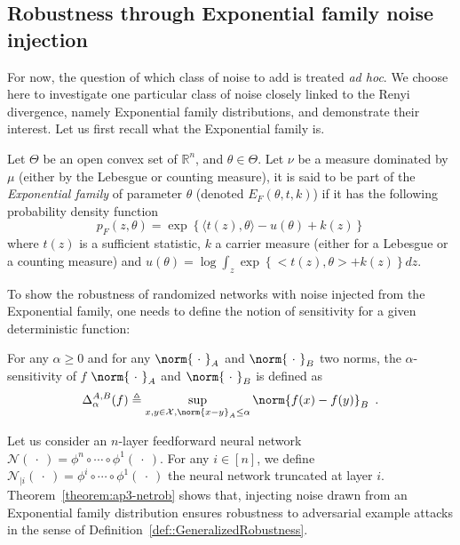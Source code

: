 \subsection{Robustness through Exponential family noise injection}

For now, the question of which class of noise to add is treated \textit{ad hoc}.
We choose here to investigate one particular class of noise closely linked to the Renyi divergence, namely Exponential family distributions, and demonstrate their interest.
Let us first recall what the Exponential family is.

\begin{definition}
  Let $\Theta$ be an open convex set of $\mathbb{R}^{n}$, and $\theta \in \Theta$.
  Let $\nu$ be a measure dominated by $\mu$ (either by the Lebesgue or counting measure), it is said to be part of the \emph{Exponential family} of parameter $\theta$ (denoted $E_{F}(\theta,t,k)$) if it has the following probability density function 
  \begin{equation}
    p_{F}(z,\theta)=\exp\left\{ \langle t(z),\theta \rangle -u(\theta) +k(z) \right\}
  \end{equation}
  where $t(z)$ is a sufficient statistic, $k$ a carrier measure (either for a Lebesgue or a counting measure) and $u(\theta) = \log \int_{z} \exp\left\{ <t(z),\theta> +k(z) \right\} dz $.
\end{definition}

\noindent
To show the robustness of randomized networks with noise injected from the Exponential family, one needs to define the notion of sensitivity for a given deterministic function:
\begin{definition}
  For any $\alpha\geq0$ and for any $\norm{\ \cdot\ }_A$ and $\norm{\ \cdot\ }_B$ two norms, the $\alpha$-sensitivity of $f$ \wrt $\norm{\ \cdot\ }_A$ and $\norm{\ \cdot\ }_B$ is defined as
  \begin{equation}
    \Delta^{A,B}_\alpha(f) \triangleq \sup\limits_{ x,y \in \mathcal{X}, \norm{x-y}_{A} \leq \alpha} \norm{f(x) - f(y)}_B \enspace.
  \end{equation}
  \removespace
\end{definition}

\noindent
Let us consider an  $n$-layer feedforward neural network  $\mathcal{N}(\ \cdot\ ) = \phi^n \circ \cdots \circ \phi^1(\ \cdot\ )$.
For any $i\in\left[n\right]$, we define $\mathcal{N}_{|i}(\ \cdot\ ) = \phi^i\circ \cdots \circ \phi^1(\ \cdot\ )$ the neural network truncated at layer $i$.
Theorem~\ref{theorem:ap3-netrob} shows that, injecting noise drawn from an Exponential family distribution ensures robustness to adversarial example attacks in the sense of Definition~\ref{def::GeneralizedRobustness}.


